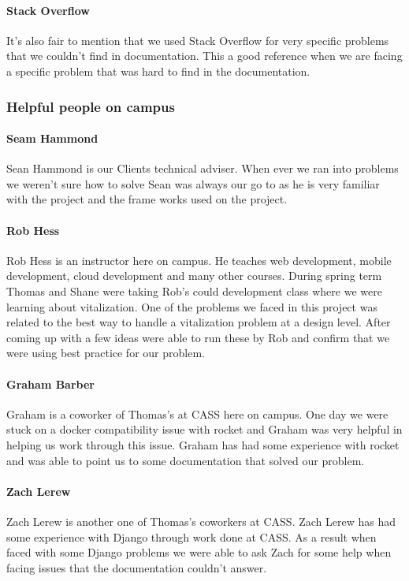 \documentclass[onecolumn, draftclsnofoot,10pt, compsoc]{article}
\begin{document}
            \paragraph{Stack Overflow} It's also fair to mention that we used Stack Overflow for very specific problems that we couldn't find in documentation. This a good reference when we are facing a specific problem that was hard to find in the documentation.\\

        \subsubsection{Helpful people on campus}
            \paragraph{Seam Hammond} Sean Hammond is our Clients technical adviser. When ever we ran into problems we weren't sure how to solve Sean was always our go to as he is very familiar with the project and the frame works used on the project.\\

            \paragraph{Rob Hess} Rob Hess is an instructor here on campus. He teaches web development, mobile development, cloud development and many other courses. During spring term Thomas and Shane were taking Rob's could development class where we were learning about vitalization. One of the problems we faced in this project was related to the best way to handle a vitalization problem at a design level. After coming up with a few ideas were able to run these by Rob and confirm that we were  using best practice for our problem.\\

            \paragraph{Graham Barber} Graham is a coworker of Thomas's at CASS here on campus. One day we were stuck on a docker compatibility issue with rocket and Graham was very helpful in helping us work through this issue. Graham has had some experience with rocket and was able to point us to some documentation that solved our problem.

            \paragraph{Zach Lerew} Zach Lerew is another one of Thomas's coworkers at CASS. Zach Lerew has had some experience with Django through work done at CASS. As a result when faced with some Django problems we were able to ask Zach for some help when facing issues that the documentation couldn't answer.\\
\end{document}
